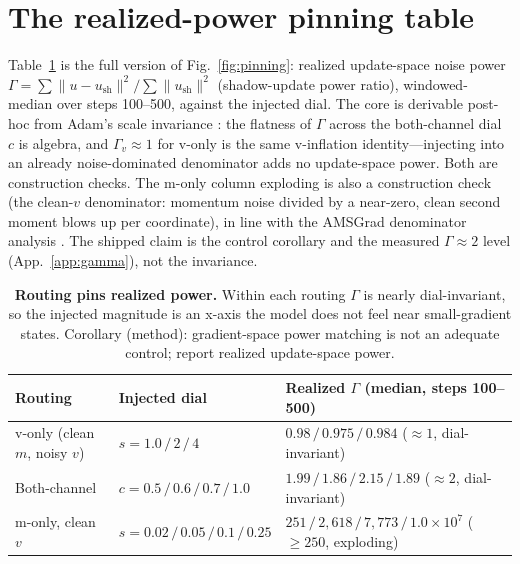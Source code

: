 \documentclass[10pt]{article}
\newcommand{\gam}{\Gamma}
\begin{document}
\section{The realized-power pinning table}
\label{app:pinning}
Table~\ref{tab:pinning-full} is the full version of Fig.~\ref{fig:pinning}:
realized update-space noise power $\gam=\sum\lVert u-u_{\text{sh}}\rVert^2/\sum\lVert
u_{\text{sh}}\rVert^2$ (shadow-update power ratio), windowed-median over steps
100--500, against the injected dial. The core is derivable post-hoc from Adam's
scale invariance \citep{adam}: the flatness of $\gam$ across the both-channel
dial $c$ is algebra, and $\gam_v\approx1$ for v-only is the same v-inflation
identity---injecting into an already noise-dominated denominator adds no
update-space power. Both are construction checks. The m-only column exploding is
also a construction check (the clean-$v$ denominator: momentum noise divided by a
near-zero, clean second moment blows up per coordinate), in line with the AMSGrad
denominator analysis \citep{amsgrad}. The shipped claim is the control corollary
and the measured $\gam\approx2$ level (App.~\ref{app:gamma}), not the invariance.

\begin{table}[h]
\centering
\footnotesize
\begin{tabular}{@{}l l l@{}}
\toprule
Routing & Injected dial & Realized $\gam$ (median, steps 100--500) \\
\midrule
v-only (clean $m$, noisy $v$) & $s=1.0\,/\,2\,/\,4$ & $0.98\,/\,0.975\,/\,0.984$ \quad ($\approx1$, dial-invariant) \\
Both-channel & $c=0.5\,/\,0.6\,/\,0.7\,/\,1.0$ & $1.99\,/\,1.86\,/\,2.15\,/\,1.89$ \quad ($\approx2$, dial-invariant) \\
m-only, clean $v$ & $s=0.02\,/\,0.05\,/\,0.1\,/\,0.25$ & $251\,/\,2{,}618\,/\,7{,}773\,/\,1.0\!\times\!10^{7}$ \quad ($\ge250$, exploding) \\
\bottomrule
\end{tabular}
\caption{\textbf{Routing pins realized power.} Within each routing $\gam$ is
nearly dial-invariant, so the injected magnitude is an x-axis the model does not
feel near small-gradient states. Corollary (method): gradient-space power
matching is not an adequate control; report realized update-space power.}
\label{tab:pinning-full}
\end{table}
\end{document}
